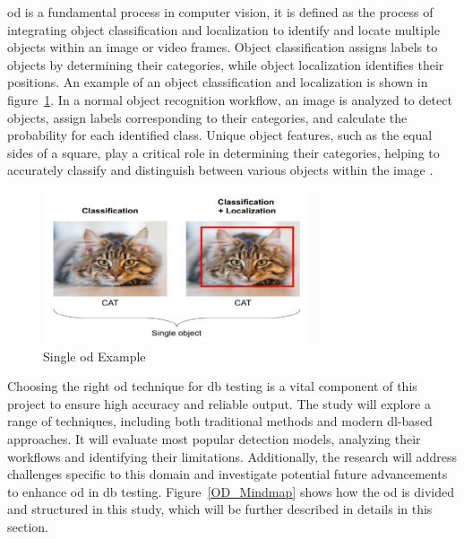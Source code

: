 \gls{od} is a fundamental process in computer vision, it is defined as the process of integrating object classification and localization to identify and locate multiple objects within an image or video frames. Object classification assigns labels to objects by determining their categories, while object localization identifies their positions. An example of an object classification and localization is shown in figure~\ref{Single_object}. In a normal object recognition workflow, an image is analyzed to detect objects, assign labels corresponding to their categories, and calculate the probability for each identified class. Unique object features, such as the equal sides of a square, play a critical role in determining their categories, helping to accurately classify and distinguish between various objects within the image \cite{oD_Review}.

\begin{figure}[!ht]
    \centering
    \includegraphics[width=0.7\textwidth]{Figures/Object_detection.PNG} 
    \caption{Single \gls{od} Example \cite{oD_Review}}
    \label{Single_object}
\end{figure}

Choosing the right \gls{od} technique for \gls{db} testing is a vital component of this project to ensure high accuracy and reliable output. The study will explore a range of techniques, including both traditional methods and modern \gls{dl}-based approaches. It will evaluate most popular detection models, analyzing their workflows and identifying their limitations. Additionally, the research will address challenges specific to this domain and investigate potential future advancements to enhance \gls{od} in \gls{db} testing. Figure~\ref{OD_Mindmap} shows how the \gls{od} is divided and structured in this study, which will be further described in details in this section.

